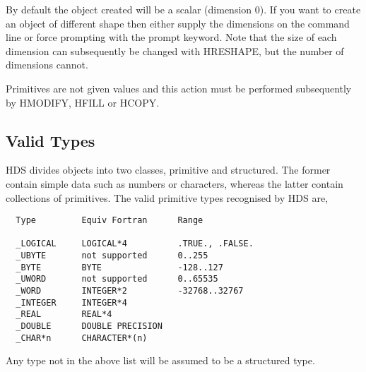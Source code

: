 \documentclass{book}
\renewcommand{\_}{{\tt\char'137}}     %
\begin{document}
By default the object created will be a scalar (dimension 0). If
you want to create an object of different shape then either
supply the dimensions on the command line or force prompting with
the prompt keyword. Note that the size of each dimension can
subsequently be changed with HRESHAPE, but the number of
dimensions cannot.

Primitives are not given values and this action must be
performed subsequently by HMODIFY, HFILL or HCOPY.

\subsection{Valid Types}
HDS divides objects into two classes, primitive and structured.
The former contain simple data such as numbers or characters,
whereas the latter contain collections of primitives. The valid
primitive types recognised by HDS are,

\begin{verbatim}
  Type         Equiv Fortran      Range

  _LOGICAL     LOGICAL*4          .TRUE., .FALSE.
  _UBYTE       not supported      0..255
  _BYTE        BYTE               -128..127
  _UWORD       not supported      0..65535
  _WORD        INTEGER*2          -32768..32767
  _INTEGER     INTEGER*4
  _REAL        REAL*4
  _DOUBLE      DOUBLE PRECISION
  _CHAR*n      CHARACTER*(n)
\end{verbatim}
Any type not in the above list will be assumed to be a structured
type.
\end{document}
